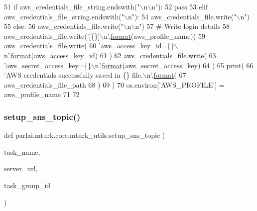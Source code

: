 \begin{DoxyCode}
51                 \textcolor{keywordflow}{if} aws\_credentials\_file\_string.endswith(\textcolor{stringliteral}{"\(\backslash\)n\(\backslash\)n"}):
52                     \textcolor{keywordflow}{pass}
53                 \textcolor{keywordflow}{elif} aws\_credentials\_file\_string.endswith(\textcolor{stringliteral}{"\(\backslash\)n"}):
54                     aws\_credentials\_file.write(\textcolor{stringliteral}{"\(\backslash\)n"})
55                 \textcolor{keywordflow}{else}:
56                     aws\_credentials\_file.write(\textcolor{stringliteral}{"\(\backslash\)n\(\backslash\)n"})
57             \textcolor{comment}{# Write login details}
58             aws\_credentials\_file.write(\textcolor{stringliteral}{'[\{\}]\(\backslash\)n'}.\hyperlink{namespaceparlai_1_1chat__service_1_1services_1_1messenger_1_1shared__utils_a32e2e2022b824fbaf80c747160b52a76}{format}(aws\_profile\_name))
59             aws\_credentials\_file.write(
60                 \textcolor{stringliteral}{'aws\_access\_key\_id=\{\}\(\backslash\)n'}.\hyperlink{namespaceparlai_1_1chat__service_1_1services_1_1messenger_1_1shared__utils_a32e2e2022b824fbaf80c747160b52a76}{format}(aws\_access\_key\_id)
61             )
62             aws\_credentials\_file.write(
63                 \textcolor{stringliteral}{'aws\_secret\_access\_key=\{\}\(\backslash\)n'}.\hyperlink{namespaceparlai_1_1chat__service_1_1services_1_1messenger_1_1shared__utils_a32e2e2022b824fbaf80c747160b52a76}{format}(aws\_secret\_access\_key)
64             )
65         print(
66             \textcolor{stringliteral}{'AWS credentials successfully saved in \{\} file.\(\backslash\)n'}.\hyperlink{namespaceparlai_1_1chat__service_1_1services_1_1messenger_1_1shared__utils_a32e2e2022b824fbaf80c747160b52a76}{format}(
67                 aws\_credentials\_file\_path
68             )
69         )
70     os.environ[\textcolor{stringliteral}{'AWS\_PROFILE'}] = aws\_profile\_name
71 
72 
\end{DoxyCode}
\mbox{\label{namespaceparlai_1_1mturk_1_1core_1_1mturk__utils_a98c01409407393818d100c21a4e07742}} 
\subsubsection{\texorpdfstring{setup\+\_\+sns\+\_\+topic()}{setup\_sns\_topic()}}
{\footnotesize\ttfamily def parlai.\+mturk.\+core.\+mturk\+\_\+utils.\+setup\+\_\+sns\+\_\+topic (\begin{DoxyParamCaption}\item[{}]{task\+\_\+name,  }\item[{}]{server\+\_\+url,  }\item[{}]{task\+\_\+group\+\_\+id }\end{DoxyParamCaption})}




